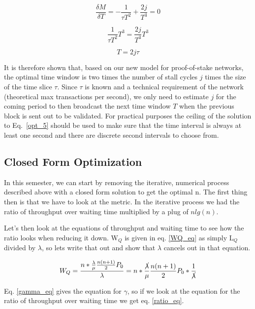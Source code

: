 \documentclass[conference]{IEEEtran}
\begin{document}
\begin{equation}
  \frac{\delta M}{\delta T} = -\frac{1}{\tau T^2}+\frac{2j}{T^3}=0\label{opt_3}
\end{equation}

\begin{equation}
  \frac{1}{\tau T^2}T^3=\frac{2j}{T^3}T^3\label{opt_4}
\end{equation}

\begin{equation}
  T=2j\tau \label{opt_5}
\end{equation}

It is therefore shown that, based on our new model for proof-of-stake networks, the optimal 
time window is two times the number of stall cycles $j$ times the size of the time slice $\tau$.
Since $\tau$ is known and a technical requirement of the network (theoretical max transactions
per second), we only need to estimate $j$ for the coming period to then broadcast the next time 
window $T$ when the previous block is sent out to be validated. For practical purposes the 
ceiling of the solution to Eq.~\ref{opt_5} should be used to make sure that the time interval is always at least one
second and there are discrete second intervals to choose from.

\iffalse
\subsection{Closed Form Optimization}\label{closed_opt}

In this semester, we can start by removing the iterative, numerical process described above with 
a closed form solution to get the optimal n. The first thing then is that we have to look at the metric.
In the iterative process we had the ratio of throughput over waiting time multiplied by a plug of $n lg(n)$. 

Let's then look at the equations of throughput and waiting time to see how the ratio looks when reducing it 
down. W$_Q$ is given in eq. \ref{WQ_eq} as simply L$_Q$ divided by $\lambda$, so lets write that out and 
show that $\lambda$ cancels out in that equation.

\begin{equation}
W_Q=\frac{n\ast\frac{\lambda}{\mu}\frac{n(n+1)}{2}P_0}{\lambda}=n\ast\frac{\cancel{\lambda}}{\mu}\frac{n(n+1)}{2}P_0\ast\frac{1}{\cancel{\lambda}}\label{WQ_reduced}
\end{equation}

Eq. \ref{gamma_eq} gives the equation for $\gamma$, so if we look at the equation for the ratio of throughput over waiting time we get eq. \ref{ratio_eq}. 
\end{document}
